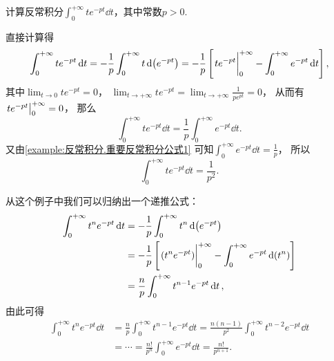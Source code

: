 \begin{example}
计算反常积分\(\int_0^{+\infty} t e^{-pt} \dd{t}\)，其中常数\(p>0\).
\begin{solution}
直接计算得\begin{equation*}
	\int_0^{+\infty} t e^{-pt} \dd{t}
	= -\frac1p \int_0^{+\infty} t \dd(e^{-pt}) %
	= -\frac1p \left[
		\eval{t e^{-pt}}_0^{+\infty}
		- \int_0^{+\infty} e^{-pt} \dd{t}
	\right],
\end{equation*}
其中\(\lim_{t\to0} t e^{-pt} = 0\)，%
\(\lim_{t\to+\infty} t e^{-pt}
= \lim_{t\to+\infty} \frac1{p e^{pt}} %
= 0\)，
从而有\(\eval{t e^{-pt}}_0^{+\infty} = 0\)，
那么\begin{equation*}
	\int_0^{+\infty} t e^{-pt} \dd{t}
	= \frac1p \int_0^{+\infty} e^{-pt} \dd{t}.
\end{equation*}
又由\cref{example:反常积分.重要反常积分公式1}
可知\(\int_0^{+\infty} e^{-pt} \dd{t} = \frac1p\)，
所以\begin{equation*}
	\int_0^{+\infty} t e^{-pt} \dd{t}
	= \frac1{p^2}.
\end{equation*}
\end{solution}
\end{example}
\begin{remark}
从这个例子中我们可以归纳出一个递推公式：\begin{align*}
	\int_0^{+\infty} t^n e^{-pt} \dd{t}
	&= -\frac1p \int_0^{+\infty} t^n \dd(e^{-pt}) \\
	&= -\frac1p \left[\eval{(t^n e^{-pt})}_0^{+\infty} - \int_0^{+\infty} e^{-pt} \dd(t^n)\right] \\
	&= \frac{n}{p} \int_0^{+\infty} t^{n-1} e^{-pt} \dd{t},
\end{align*}
由此可得\begin{align*}
	\int_0^{+\infty} t^n e^{-pt} \dd{t}
	&= \frac{n}{p} \int_0^{+\infty} t^{n-1} e^{-pt} \dd{t}
	= \frac{n(n-1)}{p^2} \int_0^{+\infty} t^{n-2} e^{-pt} \dd{t} \\
	&= \dotsb = \frac{n!}{p^n} \int_0^{+\infty} e^{-pt} \dd{t}
	= \frac{n!}{p^{n+1}}.
\end{align*}
\end{remark}

